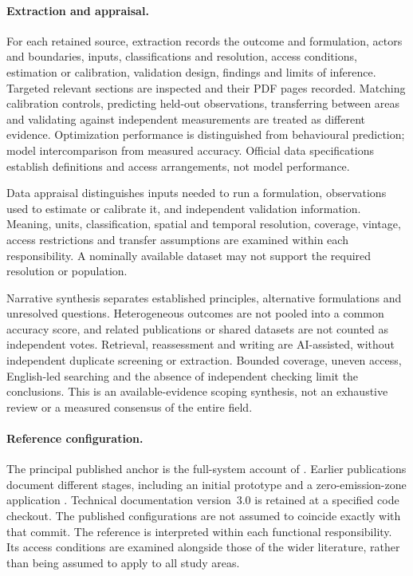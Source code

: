 \paragraph{Extraction and appraisal.}
For each retained source, extraction records the outcome and formulation, actors
and boundaries, inputs, classifications and resolution, access conditions,
estimation or calibration, validation design, findings and limits of inference.
Targeted relevant sections are inspected and their PDF pages recorded. Matching
calibration controls, predicting held-out observations, transferring between
areas and validating against independent measurements are treated as different
evidence. Optimization performance is distinguished from behavioural prediction;
model intercomparison from measured accuracy. Official data specifications
establish definitions and access arrangements, not model performance.

Data appraisal distinguishes inputs needed to run a formulation, observations
used to estimate or calibrate it, and independent validation information.
Meaning, units, classification, spatial and temporal resolution, coverage,
vintage, access restrictions and transfer assumptions are examined within each
responsibility. A nominally available dataset may not support the required
resolution or population.

Narrative synthesis separates established principles, alternative formulations
and unresolved questions. Heterogeneous outcomes are not pooled into a common
accuracy score, and related publications or shared datasets are not counted as
independent votes. Retrieval, reassessment and writing are AI-assisted, without
independent duplicate screening or extraction. Bounded coverage, uneven access,
English-led searching and the absence of independent checking limit the
conclusions. This is an available-evidence scoping synthesis, not an exhaustive
review or a measured consensus of the entire field.

\paragraph{Reference configuration.}
The principal published anchor is the full-system account of
\textcite{massgt2025}. Earlier publications document different stages, including
an initial prototype and a zero-emission-zone application
\parencite{massgt2018,massgt2022}. Technical documentation version~3.0
\parencite{massgtmanual2023} is retained at a specified code checkout. The
published configurations are not assumed to coincide exactly with that commit.
The reference is interpreted within each functional responsibility. Its access
conditions are examined alongside those of the wider literature, rather than
being assumed to apply to all study areas.

